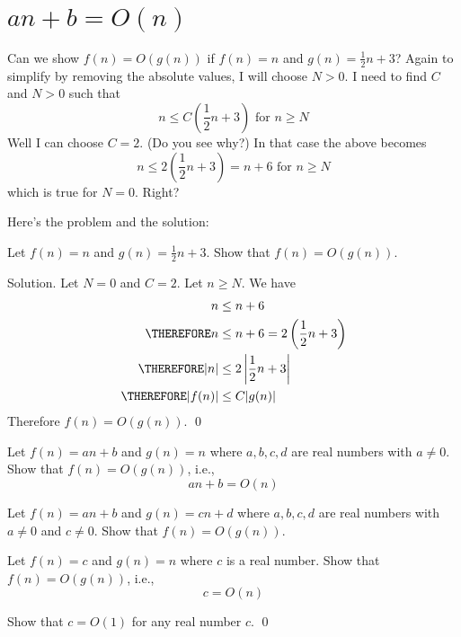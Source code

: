 \section{$an + b = O(n)$}
Can we show $f(n) = O(g(n))$ if
$f(n) = n$ and 
$g(n) = \frac{1}{2} n + 3$? 
Again to simplify by removing the absolute values, 
I will choose $N > 0$. 
I need to find $C$ and $N > 0$ such that 
\[
\text{$n \leq C \left( \frac{1}{2} n + 3 \right)$ for $n \geq N$}
\]
Well I can choose $C = 2$. (Do you see why?) In that case the above becomes
\[
\text{$n \leq 2 \left( \frac{1}{2} n + 3 \right) = n + 6$ for $n \geq N$}
\]
which is true for $N = 0$. Right?

Here's the problem and the solution:

\begin{eg}
Let $f(n) = n$ and $g(n) = \frac{1}{2}n + 3$.
Show that $f(n) = O(g(n))$.
\end{eg}

Solution.
Let $N = 0$ and $C = 2$. Let $n \geq N$.
We have
\begin{align*}
n &\leq n  + 6\\
\THEREFORE n &\leq n + 6 = 2 \left( \frac{1}{2}n + 3 \right)\\
\THEREFORE |n| &\leq 2 \left| \frac{1}{2}n + 3 \right| \\
\THEREFORE |f(n)| &\leq C |g(n)|
\end{align*}
Therefore $f(n) = O(g(n))$.
\qed

\begin{ex}
Let $f(n) = an + b$ and $g(n) = n$ 
where $a,b,c,d$ are real numbers with $a \neq 0$.
Show that $f(n) = O(g(n))$, i.e., 
\[
an + b = O(n)
\]
\end{ex}

\begin{ex}
Let $f(n) = an + b$ and $g(n) = cn + d$ 
where $a,b,c,d$ are real numbers with $a \neq 0$ and $c \neq 0$.
Show that $f(n) = O(g(n))$.
\end{ex}


\begin{ex}
Let $f(n) = c$ and $g(n) = n$ 
where $c$ is a real number.
Show that $f(n) = O(g(n))$, i.e., 
\[
c = O(n)
\]
\end{ex}

\begin{ex}
Show that $c = O(1)$ for any real number $c$.
\qed
\end{ex}
